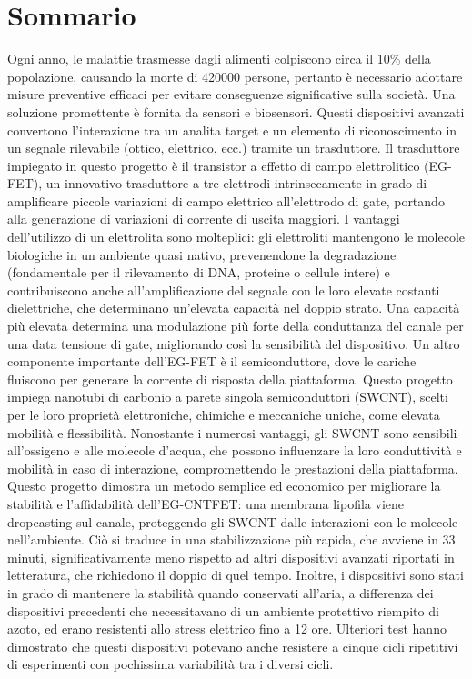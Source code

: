 \chapter*{Sommario}

Ogni anno, le malattie trasmesse dagli alimenti colpiscono circa il 10\% della popolazione, causando la morte di \num{420000} persone, pertanto è necessario adottare misure preventive efficaci per evitare conseguenze significative sulla società. Una soluzione promettente è fornita da sensori e biosensori. Questi dispositivi avanzati convertono l'interazione tra un analita target e un elemento di riconoscimento in un segnale rilevabile (ottico, elettrico, ecc.) tramite un trasduttore. Il trasduttore impiegato in questo progetto è il transistor a effetto di campo elettrolitico (EG-FET), un innovativo trasduttore a tre elettrodi intrinsecamente in grado di amplificare piccole variazioni di campo elettrico all'elettrodo di gate, portando alla generazione di variazioni di corrente di uscita maggiori. I vantaggi dell'utilizzo di un elettrolita sono molteplici: gli elettroliti mantengono le molecole biologiche in un ambiente quasi nativo, prevenendone la degradazione (fondamentale per il rilevamento di DNA, proteine o cellule intere) e contribuiscono anche all'amplificazione del segnale con le loro elevate costanti dielettriche, che determinano un'elevata capacità nel doppio strato. Una capacità più elevata determina una modulazione più forte della conduttanza del canale per una data tensione di gate, migliorando così la sensibilità del dispositivo. Un altro componente importante dell'EG-FET è il semiconduttore, dove le cariche fluiscono per generare la corrente di risposta della piattaforma. Questo progetto impiega nanotubi di carbonio a parete singola semiconduttori (SWCNT), scelti per le loro proprietà elettroniche, chimiche e meccaniche uniche, come elevata mobilità e flessibilità. Nonostante i numerosi vantaggi, gli SWCNT sono sensibili all'ossigeno e alle molecole d'acqua, che possono influenzare la loro conduttività e mobilità in caso di interazione, compromettendo le prestazioni della piattaforma. Questo progetto dimostra un metodo semplice ed economico per migliorare la stabilità e l'affidabilità dell'EG-CNTFET: una membrana lipofila viene dropcasting sul canale, proteggendo gli SWCNT dalle interazioni con le molecole nell'ambiente. Ciò si traduce in una stabilizzazione più rapida, che avviene in 33 minuti, significativamente meno rispetto ad altri dispositivi avanzati riportati in letteratura, che richiedono il doppio di quel tempo. Inoltre, i dispositivi sono stati in grado di mantenere la stabilità quando conservati all'aria, a differenza dei dispositivi precedenti che necessitavano di un ambiente protettivo riempito di azoto, ed erano resistenti allo stress elettrico fino a 12 ore. Ulteriori test hanno dimostrato che questi dispositivi potevano anche resistere a cinque cicli ripetitivi di esperimenti con pochissima variabilità tra i diversi cicli.


